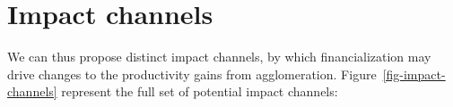 






\section{Impact channels}

We can thus propose distinct impact channels, by which financialization may drive changes to the productivity gains from agglomeration. Figure~\ref{fig-impact-channels} represent the full set of potential impact channels:

